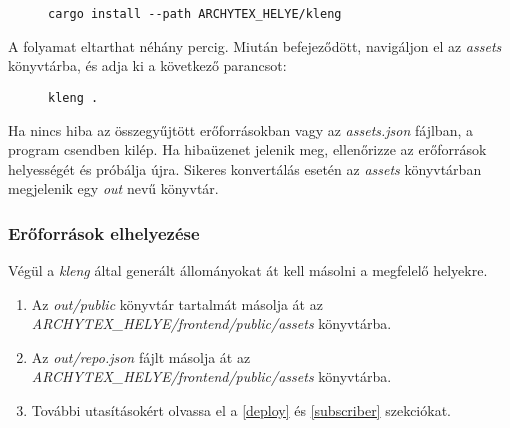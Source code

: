 \begin{figure}[H]
    \centering
    \begin{minipage}{.7\textwidth}
        \begin{lstlisting}
cargo install --path ARCHYTEX_HELYE/kleng
\end{lstlisting}
    \end{minipage}
\end{figure}

A folyamat eltarthat néhány percig. Miután befejeződött, navigáljon el az \emph{assets} könyvtárba,
és adja ki a következő parancsot:

\begin{figure}[H]
    \centering
    \begin{minipage}{.7\textwidth}
        \begin{lstlisting}
kleng .
\end{lstlisting}
    \end{minipage}
\end{figure}

Ha nincs hiba az összegyűjtött erőforrásokban vagy az \emph{assets.json} fájlban, a program
csendben kilép. Ha hibaüzenet jelenik meg, ellenőrizze az erőforrások helyességét és próbálja
újra. Sikeres konvertálás esetén az \emph{assets} könyvtárban megjelenik egy \emph{out}
nevű könyvtár.

\subsubsection{Erőforrások elhelyezése}

Végül a \emph{kleng} által generált állományokat át kell másolni a megfelelő helyekre.

\begin{enumerate}
    \item Az \emph{out/public} könyvtár tartalmát másolja át az \\
          \emph{ARCHYTEX\_HELYE/frontend/public/assets} könyvtárba.

    \item Az \emph{out/repo.json} fájlt másolja át az \\
          \emph{ARCHYTEX\_HELYE/frontend/public/assets} könyvtárba.

    \item További utasításokért olvassa el a \ref{deploy} és \ref{subscriber} szekciókat.

\end{enumerate}